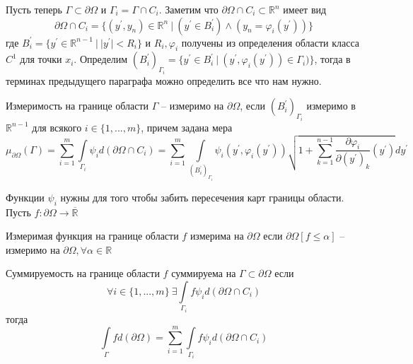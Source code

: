 \documentclass[12pt,a4paper]{article}
\newcommand{\intset}[1]{\int\limits_{#1}}
\newcommand{\Real}{\mathbb{R}}
\begin{document}
Пусть теперь $\Gamma \subset \partial \Omega$ и $\Gamma_i = \Gamma \cap C_i$. Заметим что $\partial \Omega \cap C_i \subset \Real^n$ имеет вид
\begin{equation*}
	\partial \Omega \cap C_i = \{ (y^\prime, y_n) \in \Real^n \ | \ (y^\prime \in B_i^\prime) \wedge (y_n = \varphi_i (y^\prime)) \}
\end{equation*}
где $B_i^\prime = \{ y^\prime \in \Real^{n-1} \ | \ |y^\prime| < R_i \}$ и $R_i, \varphi_i$ получены из определения области класса $C^1$ для точки $x_i$. Определим $(B_i^\prime)_{\Gamma_i} = \{ y^\prime \in B_i^\prime \ | \ (y^\prime, \varphi_i (y^\prime)) \in \Gamma_i)\}$, тогда в терминах предыдущего параграфа можно определить все что нам нужно.

\begin{definition}{Измеримость на границе области}{}
	$\Gamma$ -- измеримо на $\partial \Omega$, если $(B_i^\prime)_{\Gamma_i}$ измеримо в $\Real^{n-1}$ для всякого $i \in \{1, ..., m\}$, причем задана мера
	\begin{equation*}
		\mu_{\partial \Omega}(\Gamma) = \sum\limits_{i=1}^{m}{\intset{\Gamma_i}{\psi_i d (\partial \Omega \cap C_i)}} = \sum\limits_{i=1}^{m}{\intset{(B_i^\prime)_{\Gamma_i}}{\psi_i (y^\prime, \varphi_i (y^\prime)) \sqrt{1 + \sum\limits_{k=1}^{n-1}{\frac{\partial \varphi_i}{\partial (y^\prime)_k} (y^\prime)}} dy^\prime} }
	\end{equation*}
\end{definition}
Функции $\psi_i$ нужны для того чтобы забить пересечения карт границы области. Пусть $f : \partial \Omega \to \overline{\Real}$

\begin{definition}{Измеримая функция на границе области}{}
	$f$ измерима на $\partial \Omega$ если $\partial \Omega [f \leq \alpha]$ -- измеримо на $\partial \Omega, \forall \alpha \in \Real$
\end{definition}

\begin{definition}{Суммируемость на границе области}{}
	$f$ суммируема на $\Gamma \subset \partial \Omega$ если
	\begin{equation*}
		\forall i \in \{1, ..., m\} \ \exists \intset{\Gamma_i}{f \psi_i d(\partial \Omega \cap C_i)}
	\end{equation*}
	тогда
	\begin{equation*}
		\intset{\Gamma}{f d(\partial \Omega)} = \sum\limits_{i=1}^{m}{\intset{\Gamma_i}{f \psi_i d(\partial \Omega \cap C_i)}}
	\end{equation*}
\end{definition}
\end{document}
